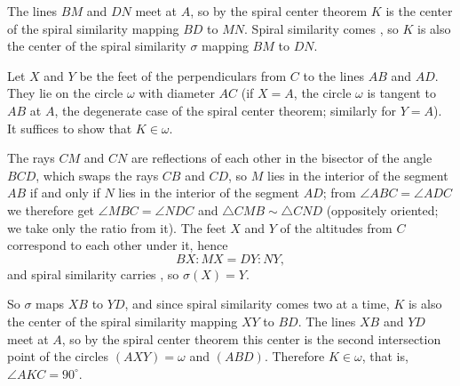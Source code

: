 {
    The lines $BM$ and $DN$ meet at $A$, so by the spiral center theorem $K$ is the center of the spiral similarity mapping $BD$ to $MN$. Spiral similarity comes , so $K$ is also the center of the spiral similarity $\sigma$ mapping $BM$ to $DN$.


    Let $X$ and $Y$ be the feet of the perpendiculars from $C$ to the lines $AB$ and $AD$. They lie on the circle $\omega$ with diameter $AC$ (if $X = A$, the circle $\omega$ is tangent to $AB$ at $A$, the degenerate case of the spiral center theorem; similarly for $Y = A$). It suffices to show that $K \in \omega$.


    The rays $CM$ and $CN$ are reflections of each other in the bisector of the angle $BCD$, which swaps the rays $CB$ and $CD$, so $M$ lies in the interior of the segment $AB$ if and only if $N$ lies in the interior of the segment $AD$; from $\angle ABC = \angle ADC$ we therefore get $\angle MBC = \angle NDC$ and $\triangle CMB \sim \triangle CND$ (oppositely oriented; we take only the ratio from it). The feet $X$ and $Y$ of the altitudes from $C$ correspond to each other under it, hence
    $$
    BX : MX = DY : NY,
    $$
    and spiral similarity carries , so $\sigma(X) = Y$.

    So $\sigma$ maps $XB$ to $YD$, and since spiral similarity comes two at a time, $K$ is also the center of the spiral similarity mapping $XY$ to $BD$. The lines $XB$ and $YD$ meet at $A$, so by the spiral center theorem this center is the second intersection point of the circles $(AXY) = \omega$ and $(ABD)$. Therefore $K \in \omega$, that is, $\angle AKC = 90^\circ$.
}

